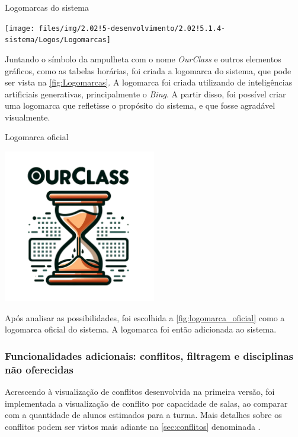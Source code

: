 \begin{MyCenteredFigure} \caption{Logomarcas do sistema} \label{fig:Logomarcas}
  \texttt{[image: files/img/2.02!5-desenvolvimento/2.02!5.1.4-sistema/Logos/Logomarcas]}
\end{MyCenteredFigure}

Juntando o símbolo da ampulheta com o nome \textit{OurClass} e outros elementos gráficos, como as tabelas horárias, foi criada a logomarca do sistema, que pode ser vista na \autoref{fig:Logomarcas}. A logomarca foi criada utilizando de inteligências artificiais generativas, principalmente o \textit{Bing}. A partir disso, foi possível criar uma logomarca que refletisse o propósito do sistema, e que fosse agradável visualmente.

\begin{MyCenteredFigure} \caption{Logomarca oficial} \label{fig:logomarca_oficial}
  \includegraphics[width=0.5\textwidth]{files/img/2.02!5-desenvolvimento/2.02!5.1.4-sistema/Logos/OurClass}
\end{MyCenteredFigure}

Após analisar as possibilidades, foi escolhida a \autoref{fig:logomarca_oficial} como a logomarca oficial do sistema. A logomarca foi então adicionada ao sistema.

\subsubsection*{Funcionalidades adicionais: conflitos, filtragem e disciplinas não oferecidas} \label{sssec:Funcionalidades Adicionais}

Acrescendo à visualização de conflitos desenvolvida na primeira versão, foi implementada a visualização de conflito por capacidade de salas, ao comparar com a quantidade de alunos estimados para a turma. Mais detalhes sobre os conflitos podem ser vistos mais adiante na \autoref{sec:conflitos} denominada .

